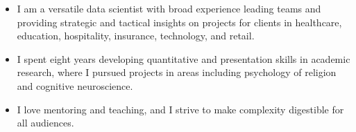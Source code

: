 
\begin{cvparagraph}

\begin{itemize}
\item {I am a versatile data scientist with broad experience leading teams and providing strategic and tactical insights on projects for clients in healthcare, education, hospitality, insurance, technology, and retail.}
\item {I spent eight years developing quantitative and presentation skills in academic research, where I pursued projects in areas including psychology of religion and cognitive neuroscience.}
\item {I love mentoring and teaching, and I strive to make complexity digestible for all audiences.}
\end{itemize}

\end{cvparagraph}
